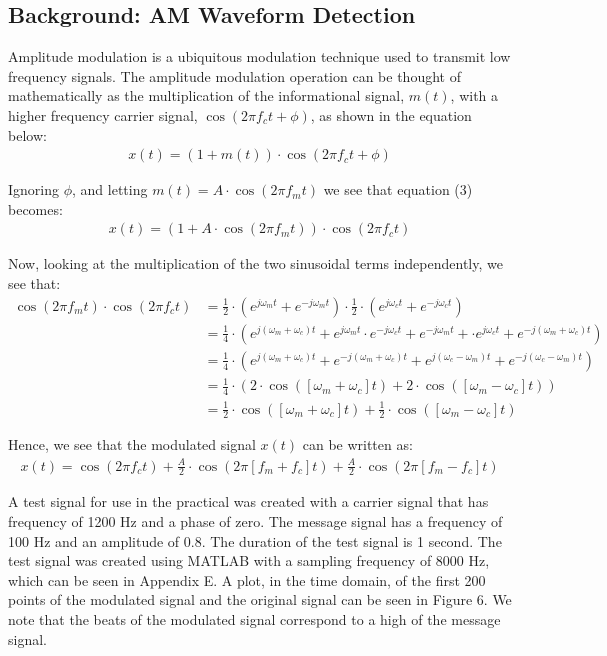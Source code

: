 \documentclass{article}
\begin{document}
\subsection{Background: AM Waveform Detection}
Amplitude modulation is a ubiquitous modulation technique used to transmit low frequency signals. The amplitude modulation operation can be thought of mathematically as the multiplication of the informational signal, $m(t)$, with a higher frequency carrier signal, $\cos (2 \pi f_c t + \phi)$, as shown in the equation below:
\begin{align}
	x(t) = (1 + m(t)) \cdot \cos(2 \pi f_c t + \phi)
\end{align}

Ignoring $\phi$, and letting $m(t) = A \cdot \cos (2 \pi f_m t)$ we see that equation (3) becomes:
\begin{align*}
	x(t) = (1 + A \cdot \cos (2 \pi f_m t)) \cdot \cos (2 \pi f_c t)
\end{align*}

Now, looking at the multiplication of the two sinusoidal terms independently, we see that:
\begin{align*}
	\cos (2 \pi f_m t) \cdot \cos (2 \pi f_c t) &= \frac{1}{2} \cdot (e^{j \omega_m t} + e^{-j \omega_m t}) \cdot \frac{1}{2} \cdot (e^{j \omega_c t} + e^{-j \omega_c t})\\
												&= \frac{1}{4} \cdot (e^{j (\omega_m + \omega_c) t} + e^{j \omega_m t} \cdot e^{-j \omega_c t} + e^{-j \omega_m t} + \cdot e^{j \omega_c t} + e^{-j (\omega_m + \omega_c) t})\\
												&= \frac{1}{4} \cdot (e^{j (\omega_m + \omega_c) t} + e^{-j (\omega_m + \omega_c) t} + e^{j (\omega_c - \omega_m)t} + e^{-j (\omega_c - \omega_m)t})\\
												&= \frac{1}{4} \cdot (2 \cdot \cos ([\omega_m + \omega_c]t) + 2 \cdot \cos ([\omega_m - \omega_c]t))\\
												&= \frac{1}{2} \cdot \cos ([\omega_m + \omega_c]t) + \frac{1}{2} \cdot \cos ([\omega_m - \omega_c]t)
\end{align*}

Hence, we see that the modulated signal $x(t)$ can be written as:
\begin{align*}
	x(t) = \cos (2 \pi f_c t) + \frac{A}{2} \cdot \cos (2 \pi [f_m + f_c]t) + \frac{A}{2} \cdot \cos (2 \pi [f_m - f_c]t)
\end{align*}

A test signal for use in the practical was created with a carrier signal that has frequency of 1200 $\si{\hertz}$ and a phase of zero. The message signal has a frequency of 100 $\si{\hertz}$ and an amplitude of 0.8. The duration of the test signal is 1 second. The test signal was created using MATLAB with a sampling frequency of 8000 $\si{\hertz}$, which can be seen in Appendix E. A plot, in the time domain, of the first 200 points of the modulated signal and the original signal can be seen in Figure 6. We note that the beats of the modulated signal correspond to a high of the message signal.\\
\end{document}
